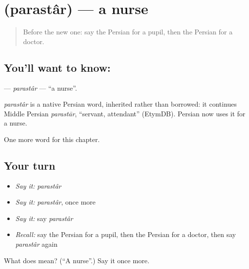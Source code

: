 \section[\texorpdfstring{\fa{پرستار} (parastâr)}{پرستار (parastâr)}]{ (parastâr) — a nurse}

\label{lesson:FA-C115-parastar}



\begin{quote}
Before the new one: say the Persian for a pupil, then the Persian for a doctor.
\end{quote}

\subsection*{You'll want to know: }
\textbf{} — \emph{parastâr} — \textquotedblleft{}a nurse\textquotedblright{}.

\begin{cousinweb}
\emph{parastâr} is a native Persian word, inherited rather than borrowed: it continues Middle Persian \emph{parastār}, \textquotedblleft{}servant, attendant\textquotedblright{} (EtymDB). Persian now uses it for a nurse.
\end{cousinweb}

\begin{grammarlens}[title={What you've built}]
One more word for this chapter.
\end{grammarlens}

\subsection*{Your turn}
\begin{itemize}
\raggedright
  \item \emph{Say it:} \emph{parastâr}
  \item \emph{Say it:} \emph{parastâr}, once more
  \item \emph{Say it:} say \emph{parastâr}
  \item \emph{Recall:} say the Persian for a pupil, then the Persian for a doctor, then say \emph{parastâr} again
\end{itemize}

\begin{tcolorbox}[breakable,colback=teal!4,colframe=teal!35!black,title={Before you move on}]
What does  mean? (\textquotedblleft{}A nurse\textquotedblright{}.) Say it once more.
\end{tcolorbox}

